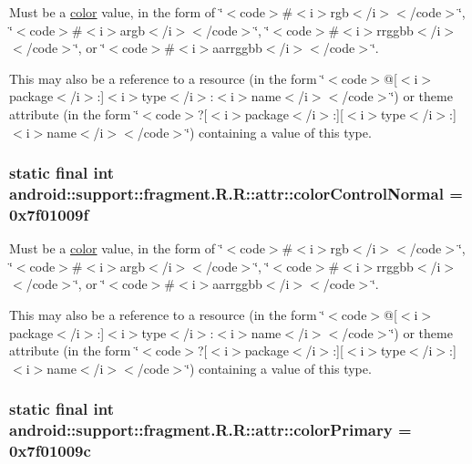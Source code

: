 Must be a \hyperlink{classandroid_1_1support_1_1fragment_1_1_r_1_1color}{color} value, in the form of \char`\"{}$<$code$>$\#$<$i$>$rgb$<$/i$>$$<$/code$>$\char`\"{}, \char`\"{}$<$code$>$\#$<$i$>$argb$<$/i$>$$<$/code$>$\char`\"{}, \char`\"{}$<$code$>$\#$<$i$>$rrggbb$<$/i$>$$<$/code$>$\char`\"{}, or \char`\"{}$<$code$>$\#$<$i$>$aarrggbb$<$/i$>$$<$/code$>$\char`\"{}. 

This may also be a reference to a resource (in the form \char`\"{}$<$code$>$@\mbox{[}$<$i$>$package$<$/i$>$:\mbox{]}$<$i$>$type$<$/i$>$:$<$i$>$name$<$/i$>$$<$/code$>$\char`\"{}) or theme attribute (in the form \char`\"{}$<$code$>$?\mbox{[}$<$i$>$package$<$/i$>$:\mbox{]}\mbox{[}$<$i$>$type$<$/i$>$:\mbox{]}$<$i$>$name$<$/i$>$$<$/code$>$\char`\"{}) containing a value of this type. \hypertarget{classandroid_1_1support_1_1fragment_1_1_r_1_1attr_d6982d8eb7840becb92b96c22c02459f}{
\subsubsection[{colorControlNormal}]{\setlength{\rightskip}{0pt plus 5cm}static final int android::support::fragment.R.R::attr::colorControlNormal = 0x7f01009f}}
\label{classandroid_1_1support_1_1fragment_1_1_r_1_1attr_d6982d8eb7840becb92b96c22c02459f}


Must be a \hyperlink{classandroid_1_1support_1_1fragment_1_1_r_1_1color}{color} value, in the form of \char`\"{}$<$code$>$\#$<$i$>$rgb$<$/i$>$$<$/code$>$\char`\"{}, \char`\"{}$<$code$>$\#$<$i$>$argb$<$/i$>$$<$/code$>$\char`\"{}, \char`\"{}$<$code$>$\#$<$i$>$rrggbb$<$/i$>$$<$/code$>$\char`\"{}, or \char`\"{}$<$code$>$\#$<$i$>$aarrggbb$<$/i$>$$<$/code$>$\char`\"{}. 

This may also be a reference to a resource (in the form \char`\"{}$<$code$>$@\mbox{[}$<$i$>$package$<$/i$>$:\mbox{]}$<$i$>$type$<$/i$>$:$<$i$>$name$<$/i$>$$<$/code$>$\char`\"{}) or theme attribute (in the form \char`\"{}$<$code$>$?\mbox{[}$<$i$>$package$<$/i$>$:\mbox{]}\mbox{[}$<$i$>$type$<$/i$>$:\mbox{]}$<$i$>$name$<$/i$>$$<$/code$>$\char`\"{}) containing a value of this type. \hypertarget{classandroid_1_1support_1_1fragment_1_1_r_1_1attr_272f99b9187dad634b6bf349c4c4aabb}{
\subsubsection[{colorPrimary}]{\setlength{\rightskip}{0pt plus 5cm}static final int android::support::fragment.R.R::attr::colorPrimary = 0x7f01009c}}
\label{classandroid_1_1support_1_1fragment_1_1_r_1_1attr_272f99b9187dad634b6bf349c4c4aabb}


